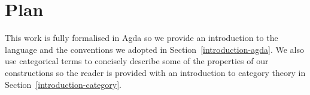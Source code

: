 \section{Plan}

This work is fully formalised in Agda so we provide an introduction
to the language and the conventions we adopted in Section~\ref{introduction-agda}.
We also use categorical terms to concisely describe some of the
properties of our constructions so the reader is provided with an
introduction to category theory in Section~\ref{introduction-category}.



